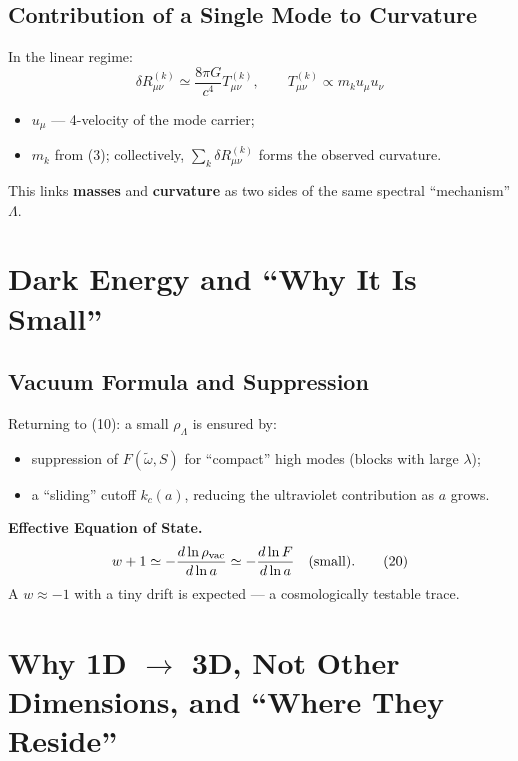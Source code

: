 \documentclass[12pt,a4paper]{article}
\begin{document}
\subsection{Contribution of a Single Mode to Curvature}
In the linear regime:
\[
\boxed{
\delta R_{\mu\nu}^{(k)} \simeq \frac{8\pi G}{c^4} T_{\mu\nu}^{(k)}, \qquad
T_{\mu\nu}^{(k)} \propto m_k u_\mu u_\nu
} \tag{19}
\]
\begin{itemize}
    \item \(u_\mu\) — 4-velocity of the mode carrier;
    \item \(m_k\) from (3); collectively, \(\sum_k \delta R_{\mu\nu}^{(k)}\) forms the observed curvature.
\end{itemize}
This links \textbf{masses} and \textbf{curvature} as two sides of the same spectral ``mechanism'' \(\Lambda\).

\section{Dark Energy and ``Why It Is Small''}

\subsection{Vacuum Formula and Suppression}
Returning to (10): a small \(\rho_\Lambda\) is ensured by:
\begin{itemize}
    \item suppression of \(F(\tilde{\omega}, S)\) for ``compact'' high modes (blocks with large \(\lambda\));
    \item a ``sliding'' cutoff \(k_c(a)\), reducing the ultraviolet contribution as \(a\) grows.
\end{itemize}

\textbf{Effective Equation of State.}
\[
w + 1 \simeq -\frac{d \ln \rho_{\rm vac}}{d \ln a} \simeq -\frac{d \ln F}{d \ln a} \quad (\text{small}). \tag{20}
\]
A \(w \approx -1\) with a tiny drift is expected — a cosmologically testable trace.

\section{Why 1D \(\to\) 3D, Not Other Dimensions, and ``Where They Reside''}
\end{document}
